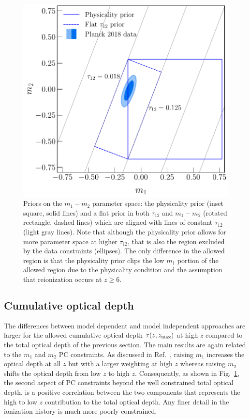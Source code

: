 \documentclass[prd,twocolumn,amsmath,amssymb,floatfix,superscriptaddress,nofootinbib]{revtex4-1}
\newcommand{\zmax}{z_{\rm max}}
\begin{document}
{{ \begin{figure}
          \includegraphics[width=0.9\columnwidth]{paper/plots/pl18_pc_zmax30_pliklite_srollv2_1015_plot_rotated_box_flat_tau_prior_fac_0.8.pdf}
          \caption {Priors on the $m_1-m_2$ parameter space: the physicality prior (inset square, solid lines) and a flat prior in
          both $\tau_{12}$ and $m_1-m_2$ (rotated rectangle, dashed lines) which are aligned with lines of constant $\tau_{12}$ (light gray lines). Note that although the physicality prior allows for more parameter space at higher $\tau_{12}$, that is also the region excluded by the data constraints (ellipses). The only difference in the allowed region is that the physicality prior clips the low $m_1$ portion of the allowed region due to the physicality condition and the assumption that reionization occurs at $z\ge 6$.} 
          \label{fig:prior_box}
\end{figure}

\subsection{Cumulative optical depth}

The differences between model dependent and model independent approaches are larger for the allowed cumulative optical depth $\tau(z, \zmax)$ at high $z$
compared to the total optical depth of the previous section.
The main results are again related to the $m_1$ and $m_2$ PC constraints. 
As discussed in Ref.~\cite{Heinrich:2016ojb}, raising $m_1$ increases the  optical depth at all $z$ but with a larger weighting at high $z$ whereas
raising $m_2$ shifts the optical depth from low $z$ to high $z$.  
Consequently, as shown in Fig.~\ref{fig:prior_box}, the second aspect of PC constraints beyond the well constrained total optical depth, is a positive
correlation between the two components that represents the high to low $z$ 
contribution to the total optical depth.  Any finer detail in the ionization history is much more poorly constrained.


}}
\end{document}
